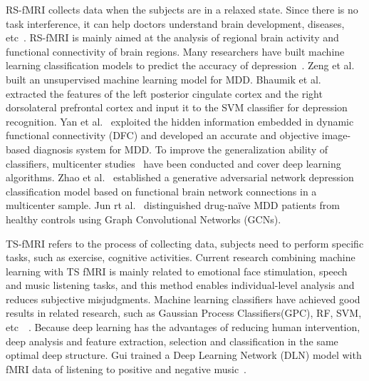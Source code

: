 RS-fMRI collects data when the subjects are in a relaxed state. Since there is no task interference, it can help doctors understand brain development, diseases, etc~\cite{2018Disrupted}. RS-fMRI is mainly aimed at the analysis of regional brain activity and functional connectivity of brain regions.
Many researchers have built machine learning classification models to predict the accuracy of depression~\cite{2013Identifying,2019Intrinsic,2019Resting}.
Zeng et al.~\cite{2014Unsupervised} built an unsupervised machine learning model for MDD.
Bhaumik et al.~\cite{2016Multivariate} extracted the features of the left posterior cingulate cortex and the right dorsolateral prefrontal cortex and input it to the SVM classifier for depression recognition.
Yan et al.~\cite{2020Quantitative} exploited the hidden information embedded in dynamic functional connectivity (DFC) and developed an accurate and objective image-based diagnosis system for MDD.
To improve the generalization ability of classifiers, multicenter studies~\cite{2020Generalizable} have been conducted and cover deep learning algorithms.
Zhao et al.~\cite{2020Functional} established a generative adversarial network depression classification model based on functional brain network connections in a multicenter sample. Jun rt al.~\cite{2020Identifying} distinguished drug-naïve MDD patients from healthy controls using Graph Convolutional Networks (GCNs). 

TS-fMRI refers to the process of collecting data, subjects need to perform specific tasks, such as exercise, cognitive activities.
Current research combining machine learning with TS fMRI is mainly related to emotional face stimulation, speech and music listening tasks, and this method enables individual-level analysis and reduces subjective misjudgments.
Machine learning classifiers have achieved good results in related research, such as Gaussian Process Classifiers(GPC), RF, SVM, etc~\cite{2013What}~\cite{2015Toward}.
Because deep learning has the advantages of reducing human intervention, deep analysis and feature extraction, selection and classification in the same optimal deep structure. Gui trained a Deep Learning Network (DLN) model with fMRI data of listening to positive and negative music~\cite{2019The1}.


